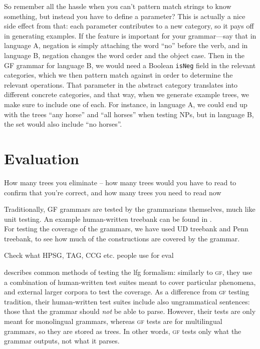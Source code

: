 \documentclass[11pt]{article}
\def\gf{\textsc{gf}}
\begin{document}
So remember all the hassle when you can't pattern match strings to
know something, but instead you have to define a parameter? This is
actually a nice side effect from that: each parameter contributes to a
new category, so it pays off in generating examples. If the feature is
important for your grammar---say that in language A, negation is
simply attaching the word  ``no'' before the verb, and in language B,
negation changes the word order and the object case. Then in the GF
grammar for language B, we would need a Boolean \texttt{isNeg} field
in the relevant categories, which we then pattern match against in
order to determine the relevant operations. That parameter in the
abstract category translates into different concrete categories, and
that way, when we generate example trees, we make sure to include one
of each. For instance, in language A, we could end up with the trees
``any horse'' and ``all horses'' when testing NPs, but in language B,
the set would also include ``no horses''. 



\section{Evaluation}

How many trees you eliminate -- how many trees would you have to read
to confirm that you're correct, and how many trees you need to read
now

Traditionally, GF grammars are tested by the grammarians themselves,
much like unit testing. An example human-written treebank can be found
in \cite[p.~136--142]{khegai2006phd}. \\
For testing the coverage of the grammars, we have used UD treebank
\cite{nivre2016ud} and Penn treebank, to see how much of the
constructions are covered by the grammar.

Check what HPSG, TAG, CCG etc. people use for eval

\cite[pp.~212--213]{butt1999lfg} describes common methods of testing the
{\sc lfg} formalism: similarly to \gf, they use a combination of
human-written test suites meant to cover particular phenomena, and
external larger corpora to test the coverage. As a difference from \gf
testing tradition, their human-written test suites include also
ungrammatical sentences: those that the grammar should \emph{not} be
able to parse. However, their tests are only meant for monolingual
grammars, whereas \gf{} tests are for multilingual grammars, so they are
stored as trees. In other words, \gf{} tests only what the grammar
outputs, not what it parses.
\end{document}
